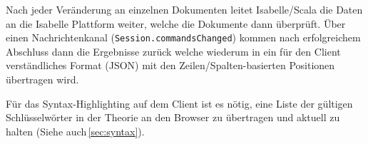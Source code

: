 Nach jeder Veränderung an einzelnen Dokumenten leitet Isabelle/Scala die Daten an die Isabelle
Plattform weiter, welche die Dokumente dann überprüft. Über einen Nachrichtenkanal
(\texttt{Session.commandsChanged}) kommen nach erfolgreichem Abschluss dann die Ergebnisse zurück
welche wiederum in ein für den Client verständliches Format (JSON) mit den Zeilen/Spalten-basierten
Positionen übertragen wird.

Für das Syntax-Highlighting auf dem Client ist es nötig, eine Liste der gültigen Schlüsselwörter in
der Theorie an den Browser zu übertragen und aktuell zu halten (Siehe auch\,\ref{sec:syntax}).
